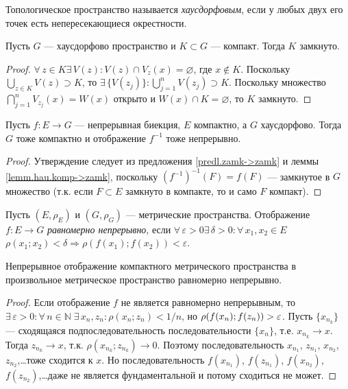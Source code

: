 \documentclass[12pt,titlepage, a4paper]{article}
\begin{document}
\begin{defen}
Топологическое пространство называется \emph{хаусдорфовым}, если у
любых двух его точек есть непересекающиеся окрестности.
\end{defen}

\begin{lemm}\label{lemm.hau.komp->zamk}
Пусть $G$ --- хаусдорфово пространство и $K\subset G$ --- компакт.
Тогда $K$ замкнуто.
\end{lemm}

\begin{proof}
$\forall\,z\in K$\;\;$\exists\,V(z):V(z)\cap V_z(x)=\varnothing$,
где $x\not\in K$. Поскольку $\bigcup\limits_{z\in K}V(z)\supset K$,
то $\exists\,\{V(z_j)\}:\bigcup\limits_{j=1}^n V(z_j)\supset K$.
Поскольку множество $\bigcap\limits_{j=1}^n V_{z_j}(x)=W(x)$ открыто
и $W(x)\cap K=\varnothing$, то $K$ замкнуто.
\end{proof}

\begin{predl}
Пусть $f\colon E\to G$ --- непрерывная биекция, $E$ компактно, а $G$
хаусдорфово. Тогда $G$ тоже компактно и отображение $f^{-1}$ тоже
непрерывно.
\end{predl}

\begin{proof}
Утверждение следует из предложения \ref{predl.zamk->zamk} и леммы
\ref{lemm.hau.komp->zamk}, поскольку $(f^{-1})^{-1}(F)=f(F)$ ---
замкнутое в $G$ множество (т.к. если $F\subset E$ замкнуто в
компакте, то и само $F$ компакт).
\end{proof}

\begin{defen}
Пусть $(E,\rho_E)$ и $(G,\rho_G)$ --- метрические пространства.
Отображение $f\colon E\to G$ \emph{равномерно непрерывно}, если
$\forall\,\varepsilon>0$\;\;$\exists\,\delta>0:\forall\, x_1,x_2\in
E$\;\;$\rho(x_1;x_2)<\delta\Rightarrow\rho(f(x_1);f(x_2))<\varepsilon$.
\end{defen}

\begin{predl}
Непрерывное отображение компактного метрического пространства в
произвольное метрическое пространство равномерно непрерывно.
\end{predl}

\begin{proof}
Если отображение $f$ не является равномерно непрерывным, то
$\exists\,\varepsilon>0:\forall\,n\in\mathbb{N}\;\exists\,x_n, z_n:
\rho(x_n;z_n)<1/n$, но $\rho(f(x_n);f(z_n))\p>\varepsilon$. Пусть
$\{x_{n_k}\}$ --- сходящаяся подпоследовательность
последовательности $\{x_n\}$, т.е. $x_{n_k}\to x$. Тогда $z_{n_k}\to
x$, т.к. $\rho(x_{n_k};z_{n_k})\to 0$. Поэтому последовательность
$x_{n_1}$, $z_{n_1}$, $x_{n_2}$, $z_{n_2}$,\ldots тоже сходится к
$x$. Но последовательность $f(x_{n_1})$, $f(z_{n_1})$, $f(x_{n_2})$,
$f(z_{n_2})$,\ldots даже не является фундаментальной и потому
сходиться не может.
\end{proof}
\end{document}
